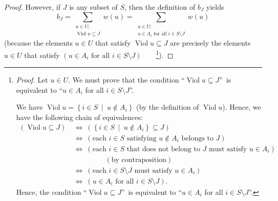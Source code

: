 \begin{proof}
However, if $J$ is any subset of $S$, then the definition of $b_{J}$ yields%
\begin{equation}
b_{J}=\sum_{\substack{u\in U;\\\operatorname*{Viol}u\subseteq J}}w\left(
u\right)  =\sum_{\substack{u\in U;\\u\in A_{i}\text{ for all }i\in S\setminus
J}}w\left(  u\right)  \label{pf.thm.pie.2.5}%
\end{equation}
(because the elements $u\in U$ that satisfy $\operatorname*{Viol}u\subseteq J$
are precisely the elements $u\in U$ that satisfy $\left(  u\in A_{i}\text{ for
all }i\in S\setminus J\right)  $\ \ \ \ \footnote{\textit{Proof.} Let $u\in
U$. We must prove that the condition \textquotedblleft$\operatorname*{Viol}%
u\subseteq J$\textquotedblright\ is equivalent to \textquotedblleft$u\in
A_{i}$ for all $i\in S\setminus J$\textquotedblright.
\par
We have $\operatorname*{Viol}u=\left\{  i\in S\ \mid\ u\notin A_{i}\right\}  $
(by the definition of $\operatorname*{Viol}u$). Hence, we have the following
chain of equivalences:%
\begin{align*}
\left(  \operatorname*{Viol}u\subseteq J\right)  \  &  \Longleftrightarrow
\ \left(  \left\{  i\in S\ \mid\ u\notin A_{i}\right\}  \subseteq J\right) \\
&  \Longleftrightarrow\ \left(  \text{each }i\in S\text{ satisfying }u\notin
A_{i}\text{ belongs to }J\right) \\
&  \Longleftrightarrow\ \left(  \text{each }i\in S\text{ that does not belong
to }J\text{ must satisfy }u\in A_{i}\right) \\
&  \ \ \ \ \ \ \ \ \ \ \ \ \ \ \ \ \ \ \ \ \left(  \text{by contraposition}%
\right) \\
&  \Longleftrightarrow\ \left(  \text{each }i\in S\setminus J\text{ must
satisfy }u\in A_{i}\right) \\
&  \Longleftrightarrow\ \left(  u\in A_{i}\text{ for all }i\in S\setminus
J\right)  .
\end{align*}
Hence, the condition \textquotedblleft$\operatorname*{Viol}u\subseteq
J$\textquotedblright\ is equivalent to \textquotedblleft$u\in A_{i}$ for all
$i\in S\setminus J$\textquotedblright.}).


\end{proof}
